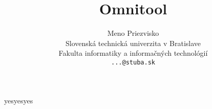 \documentclass[10pt,slovak,a4paper]{IEEEtran}
\title{Omnitool}
\author{Meno Priezvisko\\[2pt]
	{\small Slovenská technická univerzita v Bratislave}\\
	{\small Fakulta informatiky a informačných technológií}\\
	{\small \texttt{...@stuba.sk}}
	}
\begin{document}
yesyesyes
\end{document}
